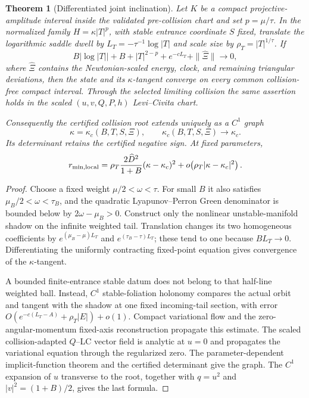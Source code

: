\documentclass[11pt]{article}
\newtheorem{theorem}{Theorem}
\begin{document}
\begin{theorem}[Differentiated joint inclination]
Let $K$ be a compact projective-amplitude interval inside the validated
pre-collision chart and set $p=\mu/\tau$.  In the normalized family
$H=\kappa|T|^p$, with stable entrance coordinate $S$ fixed, translate the
logarithmic saddle dwell by $L_T=-\tau^{-1}\log|T|$ and scale size by
$\rho_T=|T|^{1/\tau}$.  If
\[
 B|\log|T||+B+|T|^{2-p}+e^{-cL_T}
 +\|\widehat\Xi\|\longrightarrow0,
\]
where $\widehat\Xi$ contains the Newtonian-scaled energy, clock, and remaining
triangular deviations, then the state and its $\kappa$-tangent converge on
every common collision-free compact interval.  Through the selected limiting
collision the same assertion holds in the scaled $(u,v,Q,P,h)$
Levi--Civita chart.

Consequently the certified collision root extends uniquely as a $C^1$ graph
\[
 \kappa=\kappa_c(B,T,S,\Xi),
 \qquad \kappa_c(B,T,S,\Xi)\longrightarrow\kappa_c.
\]
Its determinant retains the certified negative sign.  At fixed parameters,
\[
 r_{\min,\mathrm{local}}
 =\rho_T{2\widehat D^2\over1+B}(\kappa-\kappa_c)^2
  +o\!\left(\rho_T|\kappa-\kappa_c|^2\right).
\]
\end{theorem}

\begin{proof}
Choose a fixed weight $\mu/2<\omega<\tau$.  For small $B$ it also satisfies
$\mu_B/2<\omega<\tau_B$, and the quadratic Lyapunov--Perron Green denominator
is bounded below by $2\omega-\mu_B>0$.  Construct only the nonlinear
unstable-manifold shadow on the infinite weighted tail.  Translation changes
its two homogeneous coefficients by
$e^{(\mu_B-\mu)L_T}$ and $e^{(\tau_B-\tau)L_T}$; these tend to one because
$B L_T\to0$.  Differentiating the uniformly contracting fixed-point equation
gives convergence of the $\kappa$-tangent.

A bounded finite-entrance stable datum does not belong to that half-line
weighted ball.  Instead, $C^1$ stable-foliation holonomy compares the actual
orbit and tangent with the shadow at one fixed incoming-tail section, with
error $O(e^{-c(L_T-A)}+\rho_T|E|)+o(1)$.  Compact variational flow and the
zero-angular-momentum fixed-axis reconstruction propagate this estimate.
The scaled collision-adapted $Q$--LC vector field is analytic at $u=0$ and
propagates the variational equation through the regularized zero.  The
parameter-dependent implicit-function theorem and the certified determinant
give the graph.  The $C^1$ expansion of $u$ transverse to the root, together
with $q=u^2$ and $|v|^2=(1+B)/2$, gives the last formula.
\end{proof}
\end{document}

